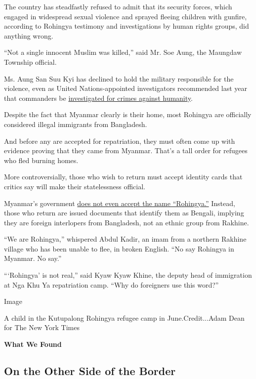 The country has steadfastly refused to admit that its security forces,
which engaged in widespread sexual violence and sprayed fleeing children
with gunfire, according to Rohingya testimony and investigations by
human rights groups, did anything wrong.

``Not a single innocent Muslim was killed,'' said Mr. Soe Aung, the
Maungdaw Township official.

Ms. Aung San Suu Kyi has declined to hold the military responsible for
the violence, even as United Nations-appointed investigators recommended
last year that commanders be
\href{https://news.un.org/en/story/2018/08/1017802}{investigated for
crimes against humanity}.

Despite the fact that Myanmar clearly is their home, most Rohingya are
officially considered illegal immigrants from Bangladesh.

And before any are accepted for repatriation, they must often come up
with evidence proving that they came from Myanmar. That's a tall order
for refugees who fled burning homes.

More controversially, those who wish to return must accept identity
cards that critics say will make their statelessness official.

Myanmar's government
\href{https://www.nytimes3xbfgragh.onion/2017/10/24/world/asia/myanmar-rohingya-ethnic-cleansing.html}{does
not even accept the name ``Rohingya.''} Instead, those who return are
issued documents that identify them as Bengali, implying they are
foreign interlopers from Bangladesh, not an ethnic group from Rakhine.

``We are Rohingya,'' whispered Abdul Kadir, an imam from a northern
Rakhine village who has been unable to flee, in broken English. ``No say
Rohingya in Myanmar. No say.''

```Rohingya' is not real,'' said Kyaw Kyaw Khine, the deputy head of
immigration at Nga Khu Ya repatriation camp. ``Why do foreigners use
this word?''

Image

A child in the Kutupalong Rohingya refugee camp in June.Credit...Adam
Dean for The New York Times

\textbf{What We Found}

\hypertarget{on-the-other-side-of-the-border}{%
\subsection{On the Other Side of the
Border}\label{on-the-other-side-of-the-border}}

